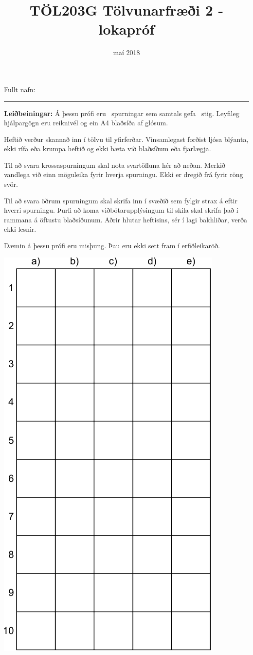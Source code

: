 \documentclass[addpoints]{exam}
\author{}
\date{}
\title{TÖL203G Tölvunarfræði 2 - lokapróf}
\author{}
\date{maí 2018}
\begin{document}
Fullt nafn: \vspace*{1mm} \hrule

\vspace{1cm}

\textbf{Leiðbeiningar:} Á þessu prófi eru \numquestions\ spurningar sem samtals gefa \numpoints\ stig.
Leyfileg hjálpargögn eru reiknivél og ein A4 blaðsíða af glósum.

Heftið verður skannað inn í tölvu til yfirferðar. Vinsamlegast forðist ljósa blýanta, ekki rífa eða krumpa heftið og ekki bæta við blaðsíðum eða fjarlægja.

Til að svara krossaspurningum skal nota svartöfluna hér að neðan. Merkið vandlega við einn möguleika fyrir hverja spurningu. Ekki er dregið frá fyrir röng svör. 

Til að svara öðrum spurningum skal skrifa inn í svæðið sem fylgir strax á eftir hverri spurningu. Þurfi að koma viðbótarupplýsingum til skila skal skrifa það í rammana á
öftustu blaðsíðunum. Aðrir hlutar heftisins, sér í lagi bakhliðar, verða ekki lesnir.

Dæmin á þessu prófi eru misþung. Þau eru ekki sett fram í erfiðleikaröð.

\begin{center}
	\includegraphics[width=0.4\linewidth]{Pics/svartafla}
\end{center}

\newpage
\end{document}
